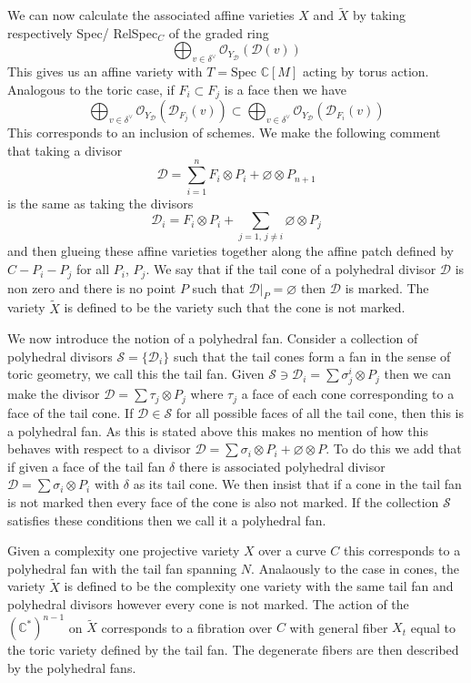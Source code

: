 \documentclass[12pt,a4paper]{book}      %
\theoremstyle{definition}
\newcommand{\mb}[1]{\mathbb{#1}}
\begin{document}
We can now calculate the associated affine varieties $X$ and $\tilde{X}$ by taking respectively Spec/ RelSpec${_C}$ of the graded ring
\[
\bigoplus_{v \in \delta^\vee} \mathcal{O}_{Y_\mathcal{D}} ( \mathcal{D}(v))
\]
This gives us an affine variety with $T = \text{Spec } \mathbb{C}[M]$ acting by torus action. Analogous to the toric case, if $F_i \subset F_j$ is a face then we have
\[
\bigoplus_{v \in \delta^\vee} \mathcal{O}_{Y_\mathcal{D}}( \mathcal{D}_{F_j}(v)) \subset \bigoplus_{v \in \delta^\vee} \mathcal{O}_{Y_\mathcal{D}}( \mathcal{D}_{F_i}(v)) 
\]
This corresponds to an inclusion of schemes. We make the following comment that taking a divisor 
\[ 
\mathcal{D} = \sum_{i = 1}^n F_i \otimes P_i + \varnothing \otimes P_{n+1}
\]
is the same as taking the divisors 
\[
\mathcal{D}_i = F_i \otimes P_i  + \sum_{j=1, \, j \neq i} \varnothing \otimes P_j
\]
and then glueing these affine varieties together along the affine patch defined by $C-P_i - P_j$ for all $P_i$, $P_j$. We say that if the tail cone of a polyhedral divisor $\mathcal{D}$ is non zero and there is no point $P$ such that $\mathcal{D}|_P = \varnothing$ then $\mathcal{D}$ is marked. The variety $\widetilde{X}$ is defined to be the variety such that the cone is not marked.


We now introduce the notion of a polyhedral fan. Consider a collection of polyhedral divisors $\mathcal{S} = \{ \mathcal{D}_i \}$ such that the tail cones form a fan in the sense of toric geometry, we call this the tail fan. Given $\mathcal{S} \ni \mathcal{D}_i = \sum \sigma^i_j \otimes P_j$ then  we can make the divisor $\mathcal{D} = \sum \tau_j \otimes P_j$ where $\tau_j$ a face of each cone corresponding to a face of the tail cone. If $\mathcal{D} \in \mathcal{S}$ for all possible faces of all the tail cone, then this is a polyhedral fan. As this is stated above this makes no mention of how this behaves with respect to a divisor $\mathcal{D} = \sum \sigma_i \otimes P_i + \varnothing \otimes P$. 
To do this we add that if given a face of the tail fan $\delta$ there is associated polyhedral divisor $\mathcal{D} = \sum \sigma_i \otimes P_i$ with $\delta$ as its tail cone. We then insist that if a cone in the tail fan is not marked then every face of the cone is also not marked. If the collection $\mathcal{S}$ satisfies these conditions then we call it a polyhedral fan.


Given a complexity one projective variety $X$ over a curve $C$ this corresponds to a polyhedral fan with the tail fan spanning $N$. Analaously to the case in cones, the variety $\widetilde{X}$ is defined to be the complexity one variety with the same tail fan and polyhedral divisors however every cone is not marked. The action of the $(\mb{C}^*)^{n-1}$ on $\widetilde{X}$ corresponds to a fibration over $C$ with general fiber $X_t$ equal to the toric variety defined by the tail fan. The degenerate fibers are then described by the polyhedral fans. 
\end{document}
